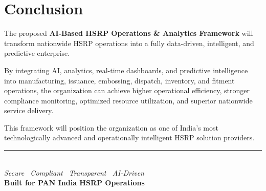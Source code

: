 \documentclass[11pt,a4paper]{article}
\begin{document}
\section{Conclusion}

The proposed \textbf{AI-Based HSRP Operations \& Analytics Framework} will transform nationwide HSRP operations into a fully data-driven, intelligent, and predictive enterprise.

By integrating AI, analytics, real-time dashboards, and predictive intelligence into manufacturing, issuance, embossing, dispatch, inventory, and fitment operations, the organization can achieve higher operational efficiency, stronger compliance monitoring, optimized resource utilization, and superior nationwide service delivery.

This framework will position the organization as one of India's most technologically advanced and operationally intelligent HSRP solution providers.

\vspace{1.5em}
\begin{center}
    {\color{brandblue}\rule{0.6\textwidth}{1.5pt}}\\[0.5em]
    \textit{Secure \textperiodcentered\ Compliant \textperiodcentered\ Transparent \textperiodcentered\ AI-Driven}\\[0.3em]
    \textbf{\color{brandblue}Built for PAN India HSRP Operations}
\end{center}
\end{document}
